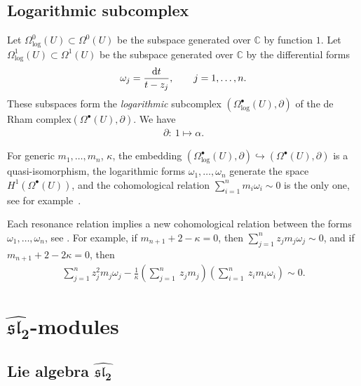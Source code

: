 \documentclass[pdftex]{sigma}
\numberwithin{equation}{section}
\begin{document}
\subsection{Logarithmic subcomplex} \label{log forms}
Let $\Omega_{\log}^0(U) \subset \Omega^0(U)$ be the subspace generated over ${\mathbb C}$ by function $1$. Let $\Omega_{\log}^1(U) \subset \Omega^1(U)$ be the subspace generated over ${\mathbb C}$ by the differential forms
\begin{gather*}
\omega_j=\frac{{\rm d}t}{t-z_j}, \qquad j=1,\dots,n.
\end{gather*}
These subspaces form the {\it logarithmic} subcomplex $(\Omega^\bullet_{\log}(U), \partial)$ of the de Rham complex\linebreak $(\Omega^\bullet(U), \partial)$. We have
\begin{gather*}
\partial\colon \ 1 \mapsto \alpha.
\end{gather*}

For generic $m_1,\dots, m_n$, $\kappa$, the embedding $(\Omega^\bullet_{\log}(U), \partial)\hookrightarrow (\Omega^\bullet(U), \partial)$ is a quasi-isomorphism, the logarithmic forms $\omega_1,\dots,\omega_n$ generate the space $H^1(\Omega^\bullet(U))$, and the cohomological relation $\sum\limits_{i=1}^n m_i \omega_i\sim 0$ is the only one, see for example~\cite{STV}.

Each resonance relation implies a new cohomological relation between the forms $\omega_1,\dots,\omega_n$, see \cite[Corollary 6.4]{SV2}. For example, if $m_{n+1}+2-\kappa=0$, then $\sum\limits_{j=1}^n z_j m_j\omega_j \sim 0$, and if $m_{n+1}+2-2\kappa=0$, then
\begin{gather*}
\sum_{j=1}^n z_j^2m_j\omega_j-\frac{1}{\kappa}\left(\sum_{j=1}^n\ z_jm_j\right)\left(\sum_{i=1}^n\ z_im_i\omega_i\right)\sim 0.
\end{gather*}

\section[$\widehat{{\mathfrak{sl}_2}}$-modules]{$\boldsymbol{\widehat{{\mathfrak{sl}_2}}}$-modules} \label{sec hsl}
\subsection[Lie algebra $\widehat{{\mathfrak{sl}_2}}$]{Lie algebra $\boldsymbol{\widehat{{\mathfrak{sl}_2}}}$} \label{lie alg hsl}
\end{document}
